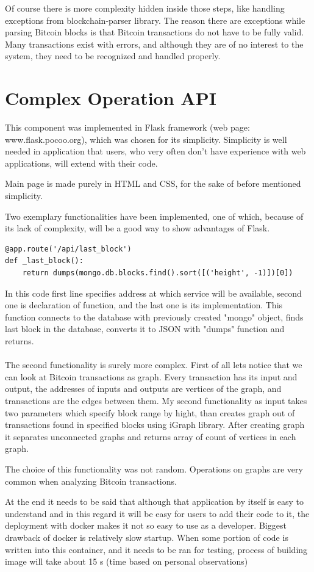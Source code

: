 \documentclass[12pt, en, eng, oneside]{mgr}
\begin{document}
Of course there is more complexity hidden inside those steps, like handling exceptions from blockchain-parser library. The reason there are exceptions while parsing Bitcoin blocks is that Bitcoin transactions do not have to be fully valid. Many transactions exist with errors, and although they are of no interest to the system, they need to be recognized and handled properly.

\section{Complex Operation API}
This component was implemented in Flask framework (web page: www.flask.pocoo.org), which was chosen for its simplicity. Simplicity is well needed in application that users, who very often don't have experience with web applications, will extend with their code. 

Main page is made purely in HTML and CSS, for the sake of before mentioned simplicity.

Two exemplary functionalities have been implemented, one of which, because of its lack of complexity, will be a good way to show advantages of Flask.
\begin{verbatim}
@app.route('/api/last_block')
def _last_block():
    return dumps(mongo.db.blocks.find().sort([('height', -1)])[0])
\end{verbatim}
In this code first line specifies address at which service will be available, second one is declaration of function, and the last one is its implementation. This function connects to the database with previously created "mongo" object, finds last block in the database, converts it to JSON with "dumps" function and returns.
\\
\\
The second functionality is surely more complex. First of all lets notice that we can look at Bitcoin transactions as graph. Every transaction has its input and output, the addresses of inputs and outputs are vertices of the graph, and transactions are the edges between them. My second functionality as input takes two parameters which specify block range by hight, than creates graph out of transactions found in specified blocks using iGraph library. After creating graph it separates unconnected graphs and returns array of count of vertices in each graph.

The choice of this functionality was not random. Operations on graphs are very common when analyzing Bitcoin transactions.

At the end it needs to be said that although that application by itself is easy to understand and in this regard it will be easy for users to add their code to it, the deployment with docker makes it not so easy to use as a developer. Biggest drawback of docker is relatively slow startup. When some portion of code is written into this container, and it needs to be ran for testing, process of building image will take about 15 s (time based on personal observations) 
\end{document}
